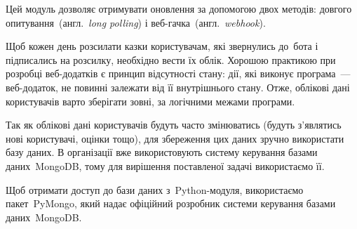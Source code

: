 \documentclass[
	a4paper,
	oneside,
	BCOR = 10mm,
	DIV = 12,
	12pt,
	headings = normal,
]{scrartcl}
\newcommand{\transeng}[1]{{англ.}~\textit{\textenglish{#1}}}
\begin{document}
			Цей модуль дозволяє отримувати оновлення за допомогою двох методів: довгого опитування~(\transeng{long polling}) і веб-гачка~(\transeng{webhook}).

			Щоб кожен день розсилати казки користувачам, які звернулись до~бота і підписались на розсилку, необхідно вести їх облік. Хорошою практикою при розробці веб-додатків є принцип відсутності стану: дії, які виконує програма~— веб-додаток, не повинні залежати від її внутрішнього стану. Отже, облікові дані користувачів варто зберігати зовні, за логічними межами програми.
			
			Так як облікові дані користувачів будуть часто змінюватись (будуть з'я\-вля\-тись нові користувачі, оцінки тощо), для збереження цих даних зручно використати базу даних. В організації вже використовують систему керування базами даних~\textenglish{MongoDB}, тому для вирішення поставленої задачі використаємо її.

			Щоб отримати доступ до бази даних з~\textenglish{Python}-модуля, використаємо пакет~\textenglish{PyMongo}, який надає офіційний розробник системи керування базами даних~\textenglish{MongoDB}.
\end{document}
